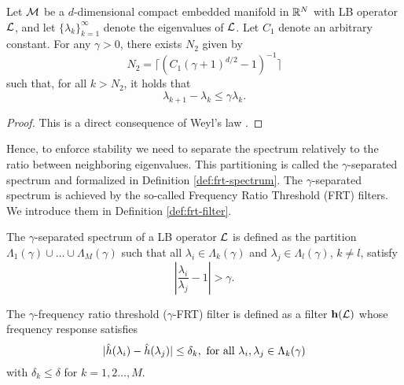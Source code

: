 \begin{proposition} \label{prop:finite_num_rela}
Let ${\mathcal M}$ be a $d$-dimensional compact embedded manifold in ${\mathbb R}^N$ with LB operator ${\mathcal L}$, and let $\{\lambda_k\}_{k=1}^\infty$ denote the eigenvalues of ${\mathcal L}$. Let $C_1$ denote an arbitrary constant. For any $\gamma > 0$, there exists $N_2$ given by
\begin{equation}
    N_2=\lceil (C_1 (\gamma+1)^{d/2}-1)^{-1} \rceil
\end{equation}
such that, for all $k>N_2$, it holds that $$\lambda_{k+1}-\lambda_k\leq \gamma\lambda_k.$$
\end{proposition}
\begin{proof}
This is a direct consequence of Weyl's law \cite[Chapter~1]{arendt2009mathematical}.
\end{proof}

Hence, to enforce stability we need to separate the spectrum relatively to the ratio between neighboring eigenvalues. This partitioning is called the $\gamma$-separated spectrum and formalized in Definition \ref{def:frt-spectrum}. The $\gamma$-separated spectrum is achieved by the so-called Frequency Ratio Threshold (FRT) filters. We introduce them in Definition \ref{def:frt-filter}.


\begin{definition}\label{def:frt-spectrum}
The $\gamma$-separated spectrum of a LB operator ${\mathcal L}$ is defined as the partition $\Lambda_1(\gamma)\cup\hdots \cup\Lambda_M(\gamma)$ such that all $\lambda_i\in\Lambda_k(\gamma)$ and $\lambda_j\in\Lambda_l(\gamma)$, $k\neq l$, satisfy
\begin{equation}
\label{eqn:frt-spectrum}
\left|\frac{\lambda_i}{\lambda_j}-1 \right|>\gamma.
\end{equation}
\end{definition}


\begin{definition}\label{def:frt-filter}
The $\gamma$-frequency ratio threshold ($\gamma$-FRT) filter is defined as a filter ${\mathbf h}({\mathcal L})$ whose frequency response satisfies
\begin{equation}\label{eqn:frt-filter}
       |{\hat h}(\lambda_i)-{\hat h}(\lambda_j)|\leq \delta_k,\text{ for all } \lambda_i,\lambda_j\in\Lambda_k(\gamma)
\end{equation}
with $\delta_k\leq \delta$ for $k=1,2\hdots,M$.
\end{definition}

